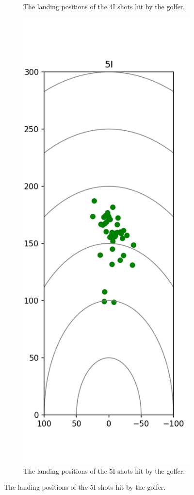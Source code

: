 \documentclass{kththesis}
\begin{document}
\begin{figure}
\begin{subfigure}{0.4\textwidth}
    \caption{The landing positions of the 4I shots hit by the golfer.}
    \label{fig:4I_shots}
    \end{subfigure}
    \begin{subfigure}{0.4\textwidth}
    \centering
    \includegraphics[height=0.4\textheight]{Shots/5I_shots.png} 
    \caption{The landing positions of the 5I shots hit by the golfer.}
    \label{fig:5I_shots}
    \end{subfigure}
\end{figure}
\end{document}
